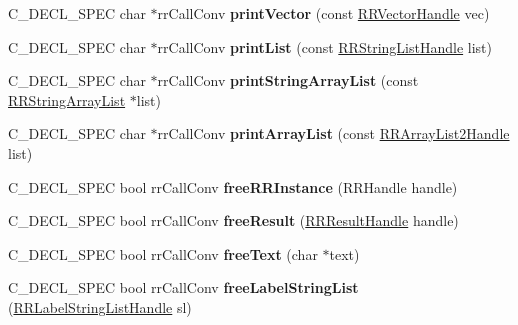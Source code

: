 \begin{DoxyCompactItemize}
\item 
\hypertarget{group__loadsave_ga577d45215017692493baa428444f1f57}{
\-C\-\_\-\-D\-E\-C\-L\-\_\-\-S\-P\-E\-C char $\ast$rr\-Call\-Conv {\bfseries print\-Vector} (const \hyperlink{struct_r_r_vector}{\-R\-R\-Vector\-Handle} vec)}
\label{group__loadsave_ga577d45215017692493baa428444f1f57}

\item 
\hypertarget{group__loadsave_ga372666f0d9956fdfcaf190ed4f813d63}{
\-C\-\_\-\-D\-E\-C\-L\-\_\-\-S\-P\-E\-C char $\ast$rr\-Call\-Conv {\bfseries print\-List} (const \hyperlink{struct_r_r_string_list}{\-R\-R\-String\-List\-Handle} list)}
\label{group__loadsave_ga372666f0d9956fdfcaf190ed4f813d63}

\item 
\hypertarget{group__loadsave_ga6fe9d99e416f3a8791b0d80226a74099}{
\-C\-\_\-\-D\-E\-C\-L\-\_\-\-S\-P\-E\-C char $\ast$rr\-Call\-Conv {\bfseries print\-String\-Array\-List} (const \hyperlink{struct_r_r_string_array_list}{\-R\-R\-String\-Array\-List} $\ast$list)}
\label{group__loadsave_ga6fe9d99e416f3a8791b0d80226a74099}

\item 
\hypertarget{group__loadsave_ga01ee2cd3cf82cfd67149944282eafbb6}{
\-C\-\_\-\-D\-E\-C\-L\-\_\-\-S\-P\-E\-C char $\ast$rr\-Call\-Conv {\bfseries print\-Array\-List} (const \hyperlink{struct_r_r_array_list2}{\-R\-R\-Array\-List2\-Handle} list)}
\label{group__loadsave_ga01ee2cd3cf82cfd67149944282eafbb6}

\item 
\hypertarget{group__loadsave_ga59ccea13a522b2ce61220cff4ea761c2}{
\-C\-\_\-\-D\-E\-C\-L\-\_\-\-S\-P\-E\-C bool rr\-Call\-Conv {\bfseries free\-R\-R\-Instance} (\-R\-R\-Handle handle)}
\label{group__loadsave_ga59ccea13a522b2ce61220cff4ea761c2}

\item 
\hypertarget{group__loadsave_ga7a1fb56bd09bb535af7b6f3bc51c89b5}{
\-C\-\_\-\-D\-E\-C\-L\-\_\-\-S\-P\-E\-C bool rr\-Call\-Conv {\bfseries free\-Result} (\hyperlink{struct_r_r_result}{\-R\-R\-Result\-Handle} handle)}
\label{group__loadsave_ga7a1fb56bd09bb535af7b6f3bc51c89b5}

\item 
\hypertarget{group__loadsave_ga1001b1dab86472f6db5bcbe724c41631}{
\-C\-\_\-\-D\-E\-C\-L\-\_\-\-S\-P\-E\-C bool rr\-Call\-Conv {\bfseries free\-Text} (char $\ast$text)}
\label{group__loadsave_ga1001b1dab86472f6db5bcbe724c41631}

\item 
\hypertarget{group__loadsave_gadca4757725ec2e3d8251a001fde8028b}{
\-C\-\_\-\-D\-E\-C\-L\-\_\-\-S\-P\-E\-C bool rr\-Call\-Conv {\bfseries free\-Label\-String\-List} (\hyperlink{struct_r_r_label_string_list}{\-R\-R\-Label\-String\-List\-Handle} sl)}
\label{group__loadsave_gadca4757725ec2e3d8251a001fde8028b}


\end{DoxyCompactItemize}
